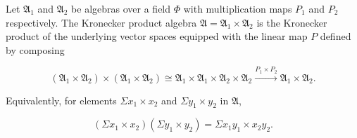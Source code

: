 Let $\mathfrak{A}_1$ and $\mathfrak{A}_2$ be algebras over a field $\Phi$ with multiplication maps $P_1$ and $P_2$ respectively. The Kronecker product algebra $\mathfrak{A} = \mathfrak{A}_1 \times \mathfrak{A}_2$ is the Kronecker product of the underlying vector spaces equipped with the linear map $P$ defined by composing

$$(\mathfrak{A}_1 \times \mathfrak{A}_2) \times (\mathfrak{A}_1 \times \mathfrak{A}_2) \cong \mathfrak{A}_1 \times \mathfrak{A}_1 \times \mathfrak{A}_2 \times \mathfrak{A}_2 \xrightarrow{P_1 \times P_2} \mathfrak{A}_1 \times \mathfrak{A}_2.$$

Equivalently, for elements $\Sigma x_1 \times x_2$ and $\Sigma y_1 \times y_2$ in $\mathfrak{A}$,

$$(\Sigma x_1 \times x_2)(\Sigma y_1 \times y_2) = \Sigma x_1 y_1 \times x_2 y_2.$$
